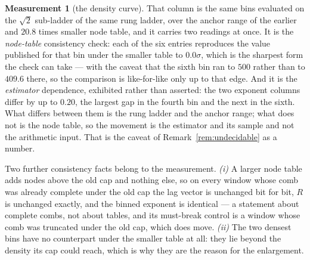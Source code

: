 \documentclass[11pt,a4paper]{article}
\theoremstyle{plain}
\theoremstyle{definition}
\newtheorem{measurement}[theorem]{Measurement}
\begin{document}
\begin{measurement}[the density curve]
That column is the same bins evaluated on the $\sqrt2$ sub-ladder of the same
rung ladder, over the anchor range of the earlier and $20.8$ times smaller node
table, and it carries two readings at once. It is the \emph{node-table}
consistency check: each of the six entries reproduces the value published for
that bin under the smaller table to $0.0\sigma$, which is the sharpest form the
check can take --- with the caveat that the sixth bin ran to $500$ rather than to
$409.6$ there, so the comparison is like-for-like only up to that edge. And it is
the \emph{estimator} dependence, exhibited rather than asserted: the two exponent
columns differ by up to $0.20$, the largest gap in the fourth bin and the next in
the sixth. What differs between them is the rung ladder and the anchor range;
what does not is the node table, so the movement is the estimator and its sample
and not the arithmetic input. That is the caveat of
Remark~\ref{rem:undecidable} as a number.

Two further consistency facts belong to the measurement. \emph{(i)} A larger node
table adds nodes above the old cap and nothing else, so on every window whose
comb was already complete under the old cap the lag vector is unchanged bit for
bit, $R$ is unchanged exactly, and the binned exponent is identical --- a
statement about complete combs, not about tables, and its must-break control is a
window whose comb was truncated under the old cap, which does move.
\emph{(ii)} The two densest bins have no counterpart under the smaller table at
all: they lie beyond the density its cap could reach, which is why they are the
reason for the enlargement.
\end{measurement}
\end{document}
